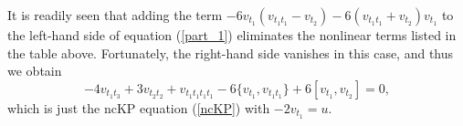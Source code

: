 \documentclass[11p,reqno]{amsart}
\numberwithin{equation}{section}
\numberwithin{equation}{section}
\begin{document}
It is readily seen that adding the term $-6v_{t_1}(v_{t_1t_1} - v_{t_2}) - 6(v_{t_1t_1} + v_{t_2})v_{t_1}$ to the left-hand side of equation (\ref{part_1}) eliminates the nonlinear terms listed in the table above. Fortunately, the right-hand side vanishes in this case, and thus we obtain
\begin{equation} \label{nckp}
    -4v_{t_1t_3} + 3v_{t_2t_2} + v_{t_1t_1t_1t_1} - 6\{v_{t_1}, v_{t_1t_1}\} + 6[v_{t_1}, v_{t_2}] = 0,
\end{equation}
which is just the ncKP equation (\ref{ncKP}) with $-2v_{t_1} = u$. 
\end{document}

